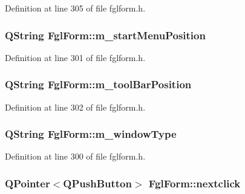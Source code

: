 Definition at line 305 of file fglform.h.

\hypertarget{classFglForm_a94e20a9c06c349d6e7c5ec47c03de4a6}{
\subsubsection[{m\_\-startMenuPosition}]{\setlength{\rightskip}{0pt plus 5cm}QString {\bf FglForm::m\_\-startMenuPosition}}}
\label{classFglForm_a94e20a9c06c349d6e7c5ec47c03de4a6}


Definition at line 301 of file fglform.h.

\hypertarget{classFglForm_a0008c6a1c3362095ebd5ab0601910003}{
\subsubsection[{m\_\-toolBarPosition}]{\setlength{\rightskip}{0pt plus 5cm}QString {\bf FglForm::m\_\-toolBarPosition}}}
\label{classFglForm_a0008c6a1c3362095ebd5ab0601910003}


Definition at line 302 of file fglform.h.

\hypertarget{classFglForm_aff3b675ee7063af63839e029f66b4075}{
\subsubsection[{m\_\-windowType}]{\setlength{\rightskip}{0pt plus 5cm}QString {\bf FglForm::m\_\-windowType}}}
\label{classFglForm_aff3b675ee7063af63839e029f66b4075}


Definition at line 300 of file fglform.h.

\hypertarget{classFglForm_a17945f68955698f41dac6b11cf73cd07}{
\subsubsection[{nextclick}]{\setlength{\rightskip}{0pt plus 5cm}QPointer$<$QPushButton$>$ {\bf FglForm::nextclick}}}
\label{classFglForm_a17945f68955698f41dac6b11cf73cd07}


